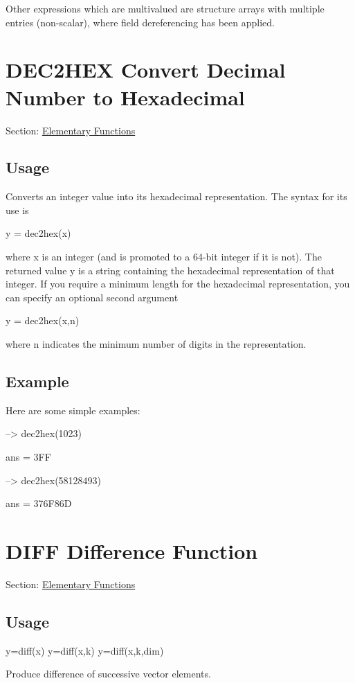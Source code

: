  Other expressions which are multivalued are structure arrays with multiple entries (non-\/scalar), where field dereferencing has been applied. \hypertarget{elementary_dec2hex}{}\section{D\-E\-C2\-H\-E\-X Convert Decimal Number to Hexadecimal}\label{elementary_dec2hex}
Section\-: \hyperlink{sec_elementary}{Elementary Functions} \hypertarget{vtkwidgets_vtkxyplotwidget_Usage}{}\subsection{Usage}\label{vtkwidgets_vtkxyplotwidget_Usage}
Converts an integer value into its hexadecimal representation. The syntax for its use is \begin{DoxyVerb}   y = dec2hex(x)
\end{DoxyVerb}
 where {\ttfamily x} is an integer (and is promoted to a 64-\/bit integer if it is not). The returned value {\ttfamily y} is a string containing the hexadecimal representation of that integer. If you require a minimum length for the hexadecimal representation, you can specify an optional second argument \begin{DoxyVerb}   y = dec2hex(x,n)
\end{DoxyVerb}
 where {\ttfamily n} indicates the minimum number of digits in the representation. \hypertarget{variables_struct_Example}{}\subsection{Example}\label{variables_struct_Example}
Here are some simple examples\-:


\begin{DoxyVerbInclude}
--> dec2hex(1023)

ans = 
3FF
\end{DoxyVerbInclude}



\begin{DoxyVerbInclude}
--> dec2hex(58128493)

ans = 
376F86D
\end{DoxyVerbInclude}
 \hypertarget{elementary_diff}{}\section{D\-I\-F\-F Difference Function}\label{elementary_diff}
Section\-: \hyperlink{sec_elementary}{Elementary Functions} \hypertarget{vtkwidgets_vtkxyplotwidget_Usage}{}\subsection{Usage}\label{vtkwidgets_vtkxyplotwidget_Usage}
\begin{DoxyVerb}        y=diff(x)
        y=diff(x,k)
        y=diff(x,k,dim)
\end{DoxyVerb}
 Produce difference of successive vector elements.

